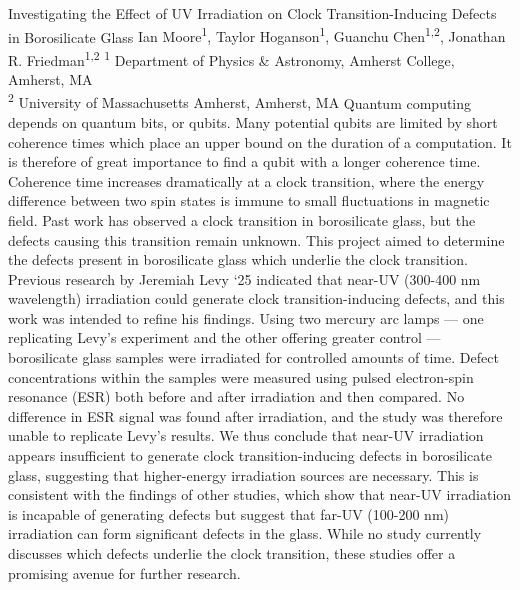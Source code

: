 \makeabstract
    {
    Investigating the Effect of UV Irradiation on Clock Transition-Inducing Defects in Borosilicate Glass
    }
    {
    Ian Moore\textsuperscript{1}, Taylor Hoganson\textsuperscript{1}, Guanchu Chen\textsuperscript{1,2}, Jonathan R. Friedman\textsuperscript{1,2}
    }
    {
    \textsuperscript{1} Department of Physics \& Astronomy, Amherst College, Amherst, MA\\
\textsuperscript{2} University of Massachusetts Amherst, Amherst, MA
    }
    {
    Quantum computing depends on quantum bits, or qubits. Many potential qubits are limited by short coherence times which place an upper bound on the duration of a computation. It is therefore of great importance to find a qubit with a longer coherence time. Coherence time increases dramatically at a clock transition, where the energy difference between two spin states is immune to small fluctuations in magnetic field. Past work has observed a clock transition in borosilicate glass, but the defects causing this transition remain unknown. This project aimed to determine the defects present in borosilicate glass which underlie the clock transition. Previous research by Jeremiah Levy {\textquoteleft}25 indicated that near-UV (300-400 nm wavelength) irradiation could generate clock transition-inducing defects, and this work was intended to refine his findings.
    }
    {
    Using two mercury arc lamps --- one replicating Levy{\textquoteright}s experiment and the other offering greater control --- borosilicate glass samples were irradiated for controlled amounts of time. Defect concentrations within the samples were measured using pulsed electron-spin resonance (ESR) both before and after irradiation and then compared.
    }
    {
    No difference in ESR signal was found after irradiation, and the study was therefore unable to replicate Levy{\textquoteright}s results.
    }
    {
    We thus conclude that near-UV irradiation appears insufficient to generate clock transition-inducing defects in borosilicate glass, suggesting that higher-energy irradiation sources are necessary. This is consistent with the findings of other studies, which show that near-UV irradiation is incapable of generating defects but suggest that far-UV (100-200 nm) irradiation can form significant defects in the glass. While no study currently discusses which defects underlie the clock transition, these studies offer a promising avenue for further research.
    }

    \newpage
    